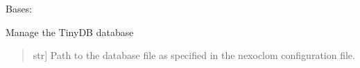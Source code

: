 \documentclass[letterpaper,10pt,english]{sphinxmanual}
\begin{document}
\begin{fulllineitems}
\label{\detokenize{nexoclom2/nexoclom2.utilities.database_operations:nexoclom2.utilities.database_operations.DatabaseOperations}}
\pysigstartsignatures
\pysigline
{}
\pysigstopsignatures
\sphinxAtStartPar
Bases: 

\sphinxAtStartPar
Manage the TinyDB database
\begin{quote}\begin{description}
\begin{description}
\end{description}

\begin{description}
\sphinxlineitem{\sphinxstylestrong{dp\_path}}{[}str{]}
\sphinxAtStartPar
Path to the database file as specified in the nexoclom configuration file.

\end{description}

\end{description}\end{quote}


\end{fulllineitems}
\end{document}
